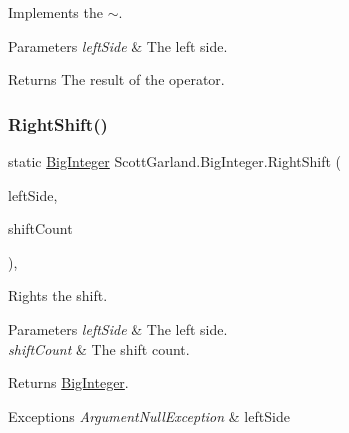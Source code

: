 Implements the $\sim$. 


\begin{DoxyParams}{Parameters}
{\em left\+Side} & The left side.\\
\hline
\end{DoxyParams}
\begin{DoxyReturn}{Returns}
The result of the operator.
\end{DoxyReturn}
\mbox{\label{class_scott_garland_1_1_big_integer_a736003e9128e125c4800c63f6c1b0073}} 
\subsubsection{\texorpdfstring{Right\+Shift()}{RightShift()}}
{\footnotesize\ttfamily static \hyperlink{class_scott_garland_1_1_big_integer}{Big\+Integer} Scott\+Garland.\+Big\+Integer.\+Right\+Shift (\begin{DoxyParamCaption}\item[{\hyperlink{class_scott_garland_1_1_big_integer}{Big\+Integer}}]{left\+Side,  }\item[{int}]{shift\+Count }\end{DoxyParamCaption})\hspace{0.3cm}{\ttfamily [inline]}, {\ttfamily [static]}}



Rights the shift. 


\begin{DoxyParams}{Parameters}
{\em left\+Side} & The left side.\\
\hline
{\em shift\+Count} & The shift count.\\
\hline
\end{DoxyParams}
\begin{DoxyReturn}{Returns}
\hyperlink{class_scott_garland_1_1_big_integer}{Big\+Integer}.
\end{DoxyReturn}

\begin{DoxyExceptions}{Exceptions}
{\em Argument\+Null\+Exception} & left\+Side\\
\hline
\end{DoxyExceptions}
\mbox{\label{class_scott_garland_1_1_big_integer_a7e0f9a9d2a70f35407d808b143ac7a0a}} 
